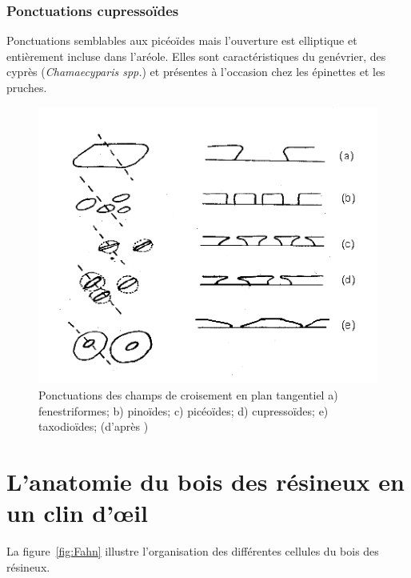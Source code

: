 \subsubsection{Ponctuations cupressoïdes}

Ponctuations semblables aux picéoïdes mais l'ouverture est elliptique et entièrement incluse dans l'aréole. Elles sont caractéristiques du genévrier, des cyprès (\textit{Chamaecyparis spp.}) et présentes à l'occasion chez les épinettes et les pruches.

\begin{figure}[h]
	\centering
	\includegraphics[scale=0.6]{img/ch3_pontuations_cote}
	\caption{Ponctuations des champs de croisement en plan tangentiel a) fenestriformes; b) pinoïdes; c) picéoïdes; d) cupressoïdes; e) taxodioïdes; (d’après \cite{butterfield2012three})}
	\label{fig:pontuations_cote}
\end{figure}

\section{L'anatomie du bois des résineux en un clin d'œil}

La figure~\ref{fig:Fahn} illustre l'organisation des différentes cellules du bois des résineux.

